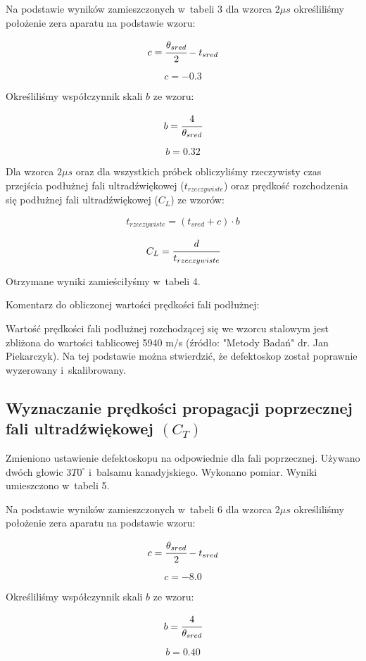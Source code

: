 \documentclass[a4paper,12pt]{article}
\begin{document}
Na podstawie wyników zamieszczonych w~tabeli 3 dla wzorca $2\mu s$ określiliśmy położenie zera aparatu na podstawie wzoru:

$$c=\cfrac{\theta _{sred}}{2}-t_{sred}$$

$$c=-0.3$$

Określiliśmy współczynnik skali $b$ ze wzoru:

$$b=\cfrac{4}{\theta _{sred}}$$

$$b=0.32$$

Dla wzorca $2\mu s$ oraz dla wszystkich próbek obliczyliśmy rzeczywisty czas przejścia podłużnej fali ultradźwiękowej ($t_{rzeczywiste}$) oraz prędkość rozchodzenia się podłużnej fali ultradźwiękowej ($C_L$) ze wzorów:

$$t_{rzeczywiste}=(t_{sred}+c)\cdot b$$

$$C_L=\cfrac{d}{t_{rzeczywiste}}$$

Otrzymane wyniki zamieściłyśmy w~tabeli 4.



Komentarz do obliczonej wartości prędkości fali podłużnej:

Wartość prędkości fali podłużnej rozchodzącej się we wzorcu stalowym jest zbliżona do wartości tablicowej 5940 m/s (źródło: "Metody Badań" dr. Jan Piekarczyk). Na tej podstawie można stwierdzić, że defektoskop został poprawnie wyzerowany i~skalibrowany. 
\newpage

\subsection{Wyznaczanie prędkości propagacji poprzecznej fali ultradźwiękowej $(C_T)$}

Zmieniono ustawienie defektoskopu na odpowiednie dla fali poprzecznej. Używano dwóch głowic $3T0^\circ$  i~balsamu kanadyjskiego. Wykonano pomiar. Wyniki umieszczono w~tabeli 5. 





Na podstawie wyników zamieszczonych w~tabeli 6 dla wzorca $2\mu s$ określiliśmy położenie zera aparatu na podstawie wzoru:

$$c=\cfrac{\theta _{sred}}{2}-t_{sred}$$

$$c=-8.0$$

Określiliśmy współczynnik skali $b$ ze wzoru:

$$b=\cfrac{4}{\theta _{sred}}$$

$$b=0.40$$
\end{document}
